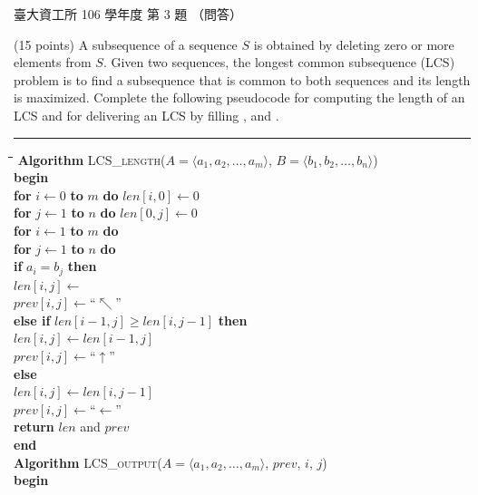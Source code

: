 \begin{pastexam}[label={px:ntu-106-dsa-03}]{臺大資工所 106 學年度 第 3 題}
（問答）

(15 points) A subsequence of a sequence $S$ is obtained by deleting zero or more elements from
$S$. Given two sequences, the longest common subsequence (LCS) problem is to find a subsequence
that is common to both sequences and its length is maximized. Complete the following pseudocode
for computing the length of an LCS and for delivering an LCS by filling ,  and
.

\smallskip
\noindent\rule{\linewidth}{0.4pt}
\begin{tabbing}
\hspace{1.5em}\=\hspace{1.5em}\=\hspace{1.5em}\=\hspace{1.5em}\=\kill
\textbf{Algorithm} \textsc{LCS\_length}($A=\langle a_1,a_2,\ldots,a_m\rangle$, $B=\langle b_1,b_2,\ldots,b_n\rangle$)\\
\textbf{begin}\\
\>\textbf{for} $i\gets 0$ \textbf{to} $m$ \textbf{do} $len[i,0]\gets 0$\\
\>\textbf{for} $j\gets 1$ \textbf{to} $n$ \textbf{do} $len[0,j]\gets 0$\\
\>\textbf{for} $i\gets 1$ \textbf{to} $m$ \textbf{do}\\
\>\>\textbf{for} $j\gets 1$ \textbf{to} $n$ \textbf{do}\\
\>\>\>\textbf{if} $a_i=b_j$ \textbf{then}\\
\>\>\>\>$len[i,j]\gets$ \\
\>\>\>\>$prev[i,j]\gets$``$\nwarrow$''\\
\>\>\>\textbf{else if} $len[i-1,j]\ge len[i,j-1]$ \textbf{then}\\
\>\>\>\>$len[i,j]\gets len[i-1,j]$\\
\>\>\>\>$prev[i,j]\gets$``$\uparrow$''\\
\>\>\>\textbf{else}\\
\>\>\>\>$len[i,j]\gets len[i,j-1]$\\
\>\>\>\>$prev[i,j]\gets$``$\leftarrow$''\\
\>\textbf{return} $len$ and $prev$\\
\textbf{end}\\[0.6em]
\textbf{Algorithm} \textsc{LCS\_output}($A=\langle a_1,a_2,\ldots,a_m\rangle$, $prev$, $i$, $j$)\\
\textbf{begin}\\

\end{tabbing}
\end{pastexam}

